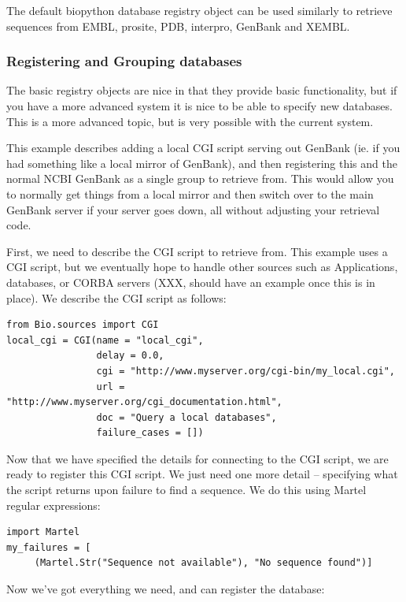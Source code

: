 \documentclass{report}
\begin{document}
The default biopython database registry object can be used similarly to
retrieve sequences from EMBL, prosite, PDB, interpro, GenBank and XEMBL.

\subsubsection{Registering and Grouping databases}

The basic registry objects are nice in that they provide basic
functionality, but if you have a more advanced system it is nice to be
able to specify new databases. This is a more advanced topic, but is
very possible with the current system. 


This example describes adding a local CGI script serving out GenBank
(ie. if you had something like a local mirror of GenBank), and then
registering this and the normal NCBI GenBank as a single group to
retrieve from. This would allow you to normally get things from a local
mirror and then switch over to the main GenBank server if your server
goes down, all without adjusting your retrieval code.


First, we need to describe the CGI script to retrieve from. This example
uses a CGI script, but we eventually hope to handle other sources such
as Applications, databases, or CORBA servers (XXX, should have an
example once this is in place). We describe the CGI script as follows:

\begin{verbatim}
from Bio.sources import CGI
local_cgi = CGI(name = "local_cgi",
                delay = 0.0,
                cgi = "http://www.myserver.org/cgi-bin/my_local.cgi",
                url = "http://www.myserver.org/cgi_documentation.html",
                doc = "Query a local databases",
                failure_cases = [])
\end{verbatim}

Now that we have specified the details for connecting to the CGI script,
we are ready to register this CGI script. We just need one more detail
-- specifying what the script returns upon failure to find a sequence.
We do this using Martel regular expressions:

\begin{verbatim}
import Martel
my_failures = [
     (Martel.Str("Sequence not available"), "No sequence found")]
\end{verbatim}

Now we've got everything we need, and can register the database:
\end{document}
